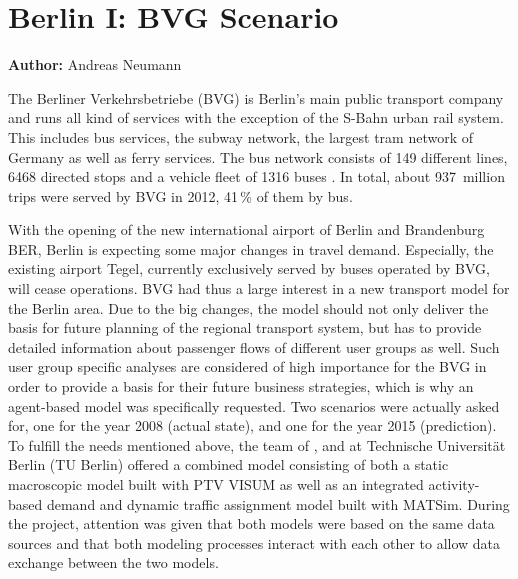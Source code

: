 \section{Berlin I: BVG Scenario}
\label{ch:scenarios:berlinI}
\hfill \textbf{Author:} Andreas Neumann

The Berliner Verkehrsbetriebe (BVG) is Berlin's main public transport company
and runs all kind of services with the exception of the S-Bahn urban rail
system. This includes bus services, the subway network, the largest tram network
of Germany as well as ferry services. The bus network consists of 149
different lines, 6468 directed stops and a vehicle fleet of 1316 buses \citep{BVG2012}.
In total, about 937~million trips were served by BVG in 2012,
41\,\% of them by bus.

With the opening of the new international airport of Berlin and Brandenburg BER,
Berlin is expecting some major changes in travel demand. Especially, the
existing airport Tegel, currently exclusively served by buses operated by BVG,
will cease operations. BVG had thus a large interest in a new transport model
for the Berlin area. Due to the big changes, the model should not only deliver
the basis for future planning of the regional transport system, but has to
provide detailed information about passenger flows of different user groups as
well. Such user group specific analyses are considered of high importance for
the BVG in order to provide a basis for their future business strategies, which
is why an agent-based model was specifically requested. Two scenarios were
actually asked for, one for the year 2008 (actual state), and one for the year
2015 (prediction). To fulfill the needs mentioned above, the team of 
\citet{PTV2013}, \citet{Senozon2013} and \citet{VSP2013} at Technische Universit{\"a}t Berlin (TU Berlin)
offered a combined model consisting of both a static macroscopic model built with
PTV VISUM \citep{VISUM2013} as well as an integrated activity-based demand and
dynamic traffic assignment model built with MATSim. During
the project, attention was given that both models were based on the same data
sources and that both modeling processes interact with each other to allow data
exchange between the two models.

